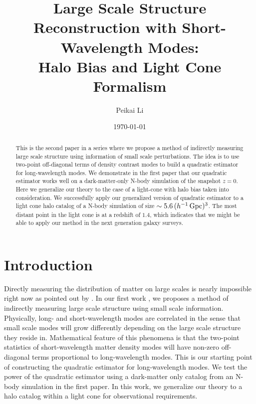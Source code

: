 \documentclass[prd,amsmath,amssymb,floatfix,superscriptaddress,nofootinbib,twocolumn]{revtex4-1}
\begin{document}
\title{Large Scale Structure Reconstruction with Short-Wavelength Modes: \\Halo Bias and Light Cone Formalism}
\author{\large Peikai Li}

\date{\today}
\begin{abstract}
\noindent This is the second paper in a series where we propose a method of indirectly measuring large scale structure using information of small scale perturbations. The idea is to use two-point off-diagonal terms of density contrast modes to build a quadratic estimator for long-wavelength modes. We demonstrate in the first paper that our quadratic estimator works well on a dark-matter-only N-body simulation of the snapshot $z=0$. Here we generalize our theory to the case of a light-cone with halo bias taken into consideration. We successfully apply our generalized version of quadratic estimator to a light cone halo catalog of a N-body simulation of size $\sim5.6\,(h^{-1}\,\rm Gpc)^3$. The most distant point in the light cone is at a redshift of $1.4$, which indicates that we might be able to apply our method in the next generation galaxy surveys.
\end{abstract}
\maketitle
\section{Introduction}
Directly measuring the distribution of matter on large scales is nearly impossible right now as pointed out by \cite{Modi:2019hydr}. In our first work \cite{Li:2020fir}, we proposes a method of indirectly measuring large scale structure using small scale information. Physically, long- and short-wavelength modes are correlated in the sense that small scale modes will grow differently depending on the large scale structure they reside in. Mathematical feature of this phenomena is that the two-point statistics of short-wavelength matter density modes will have non-zero off-diagonal terms proportional to long-wavelength modes. This is our starting point of constructing the quadratic estimator for long-wavelength modes. We test the power of the quadratic estimator using a dark-matter only catalog from an N-body simulation in the first paper. In this work, we generalize our theory to a halo catalog within a light cone for observational requirements.
\end{document}
